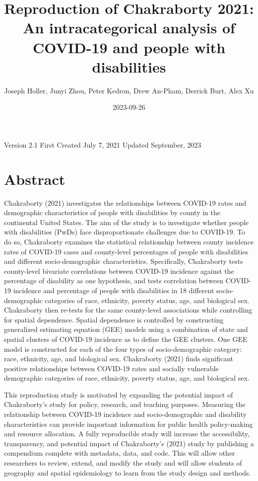 \documentclass[
]{article}
\title{Reproduction of Chakraborty 2021: An intracategorical analysis of
COVID-19 and people with disabilities}
\author{Joseph Holler, Junyi Zhou, Peter Kedron, Drew An-Pham, Derrick
Burt, Alex Xu}
\date{2023-09-26}
\begin{document}
\maketitle

Version 2.1 \textbar{} First Created July 7, 2021 \textbar{} Updated
September, 2023

\hypertarget{abstract}{%
\section{Abstract}\label{abstract}}

Chakraborty (2021) investigates the relationships between COVID-19 rates
and demographic characteristics of people with disabilities by county in
the continental United States. The aim of the study is to investigate
whether people with disabilities (PwDs) face disproportionate challenges
due to COVID-19. To do so, Chakraborty examines the statistical
relationship between county incidence rates of COVID-19 cases and
county-level percentages of people with disabilities and different
socio-demographic characteristics. Specifically, Chakraborty tests
county-level bivariate correlations between COVID-19 incidence against
the percentage of disability as one hypothesis, and tests correlation
between COVID-19 incidence and percentage of people with disabilities in
18 different socio-demographic categories of race, ethnicity, poverty
status, age, and biological sex. Chakraborty then re-tests for the same
county-level associations while controlling for spatial dependence.
Spatial dependence is controlled by constructing generalized estimating
equation (GEE) models using a combination of state and spatial clusters
of COVID-19 incidence as to define the GEE clusters. One GEE model is
constructed for each of the four types of socio-demographic category:
race, ethnicity, age, and biological sex. Chakraborty (2021) finds
significant positive relationships between COVID-19 rates and socially
vulnerable demographic categories of race, ethnicity, poverty status,
age, and biological sex.

This reproduction study is motivated by expanding the potential impact
of Chakraborty's study for policy, research, and teaching purposes.
Measuring the relationship between COVID-19 incidence and
socio-demographic and disability characteristics can provide important
information for public health policy-making and resource allocation. A
fully reproducible study will increase the accessibility, transparency,
and potential impact of Chakraborty's (2021) study by publishing a
compendium complete with metadata, data, and code. This will allow other
researchers to review, extend, and modify the study and will allow
students of geography and spatial epidemiology to learn from the study
design and methods.
\end{document}

